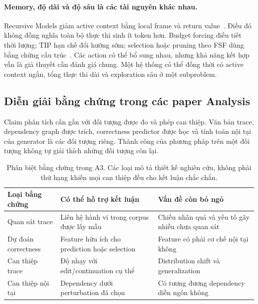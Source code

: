 \paragraph{Memory, độ dài và độ sâu là các tài nguyên khác nhau.}
Recursive Models giảm active context bằng local frame và return value~\cite{rra2_recursive_models}. Điều đó không đồng nghĩa toàn bộ thực thi sinh ít token hơn. Budget forcing điều tiết thời lượng; TIP hạn chế đổi hướng sớm; selection hoặc pruning theo FSF dùng bằng chứng cấu trúc~\cite{rra1_s1,rra3_underthinking,rra3_effective_reasoning}. Các action có thể bổ sung nhau, nhưng khả năng kết hợp vẫn là giả thuyết cần đánh giá chung. Một hệ thống có thể đồng thời có active context ngắn, tổng thực thi dài và exploration sâu ở một subproblem.

\subsection{Diễn giải bằng chứng trong các paper Analysis}
\label{subsec:a3_evidence}

Claim phân tích cần gắn với đối tượng được đo và phép can thiệp. Văn bản trace, dependency graph được trích, correctness predictor được học và tính toán nội tại của generator là các đối tượng riêng. Thành công của phương pháp trên một đối tượng không tự giải thích những đối tượng còn lại.

\begin{table}[htbp]
\centering\small
\begin{tabularx}{\textwidth}{>{\raggedright\arraybackslash}p{2.7cm}>{\raggedright\arraybackslash}X>{\raggedright\arraybackslash}X}
\toprule
\textbf{Loại bằng chứng} & \textbf{Có thể hỗ trợ kết luận} & \textbf{Vấn đề còn bỏ ngỏ} \\
\midrule
Quan sát trace & Liên hệ hành vi trong corpus được lấy mẫu & Chiều nhân quả và yếu tố gây nhiễu chưa quan sát \\
Dự đoán correctness & Feature hữu ích cho prediction hoặc selection & Feature có phải cơ chế nội tại không \\
Can thiệp trace & Độ nhạy với edit/continuation cụ thể & Distribution shift và generalization \\
Can thiệp nội tại & Dependency dưới perturbation đã chọn & Có tương đương dependency diễn ngôn không \\
\bottomrule
\end{tabularx}
\caption{Phân biệt bằng chứng trong A3. Các loại mô tả thiết kế nghiên cứu, không phải thứ hạng khiến mọi can thiệp đều cho kết luận chắc chắn.}
\label{tab:a3_evidence}
\end{table}

